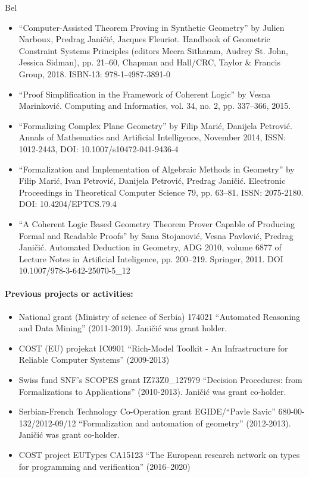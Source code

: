 \begin{sitedescription}{Bel}
  \begin{itemize}
  \item ``Computer-Assisted Theorem Proving in Synthetic Geometry'' by
    Julien Narboux, Predrag Janičić, Jacques Fleuriot. Handbook of
    Geometric Constraint Systems Principles (editors Meera Sitharam,
    Audrey St. John, Jessica Sidman), pp. 21--60, Chapman and
    Hall/CRC, Taylor & Francis Group, 2018. ISBN-13: 978-1-4987-3891-0
  \item ``Proof Simplification in the Framework of Coherent Logic'' by
    Vesna Marinković. Computing and Informatics, vol. 34, no. 2,
    pp. 337--366, 2015.
  \item ``Formalizing Complex Plane Geometry'' by Filip Marić,
    Danijela Petrović. Annals of Mathematics and Artificial
    Intelligence, November 2014, ISSN: 1012-2443, DOI:
    10.1007/s10472-041-9436-4
  \item ``Formalization and Implementation of Algebraic Methods in
    Geometry'' by Filip Marić, Ivan Petrović, Danijela Petrović,
    Predrag Janičić. Electronic Proceedings in Theoretical Computer
    Science 79, pp. 63--81. ISSN: 2075-2180. DOI: 10.4204/EPTCS.79.4
  \item ``A Coherent Logic Based Geometry Theorem Prover Capable of
    Producing Formal and Readable Proofs'' by Sana Stojanović, Vesna
    Pavlović, Predrag Janičić. Automated Deduction in Geometry, ADG
    2010, volume 6877 of Lecture Notes in Artificial Inteligence,
    pp. 200--219. Springer, 2011. DOI 10.1007/978-3-642-25070-5\_12
  \end{itemize}
    
  \paragraph{Previous projects or activities:}
  
  \begin{itemize}
  \item National grant (Ministry of science of Serbia) 174021
    ``Automated Reasoning and Data Mining'' (2011-2019). Janičić was
    grant holder.
  \item COST (EU) projekat IC0901 ``Rich-Model Toolkit - An
    Infrastructure for Reliable Computer Systems'' (2009-2013)
  \item Swiss fund SNF's SCOPES grant IZ73Z0\_127979 ``Decision
    Procedures: from Formalizations to Applications''
    (2010-2013). Јaničić was grant co-holder.
  \item Serbian-French Technology Co-Operation grant EGIDE/``Pavle
    Savic'' 680-00-132/2012-09/12 ``Formalization and automation of
    geometry'' (2012-2013). Јaničić was grant co-holder.
  \item COST project EUTypes CA15123 ``The European research network on types for programming and verification'' (2016--2020) 
  \end{itemize}


\end{sitedescription}
